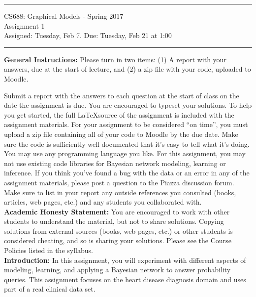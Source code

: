 \documentclass[11pt]{article}
\begin{document}
{\centering
  \rule{6.3in}{2pt}
  \vspace{1em}
  {\Large
    CS688: Graphical Models - Spring 2017 \\
    Assignment 1\\
  }
  \vspace{1em}
  Assigned: Tuesday, Feb 7. Due: Tuesday, Feb 21 at 1:00 \\
  \vspace{0.1em}
  \rule{6.3in}{1.5pt}
}
\vspace{1pc}


\textbf{General Instructions:} Please turn in two items: (1) A report with your answers, due at the start of lecture, and (2) a zip file with your code, uploaded to Moodle.

Submit a report with the answers to each question at the start of class on the date the assignment is due. You are encouraged to typeset your solutions. To help you get started, the full \LaTeX source of the assignment is included with the assignment materials. For your assignment to be considered ``on time'', you must upload a zip file containing all of your code to Moodle by the due date. Make sure the code is sufficiently well documented that it's easy to tell what it's doing. You may use any programming language you like. For this assignment, you may not use existing code libraries for Bayesian network modeling, learning or inference. If you think you've found a bug with the data or an error in any of the assignment materials, please post a question to the Piazza discussion forum. Make sure to list in your report any outside references you consulted (books, articles, web pages, etc.) and any students you collaborated with.\\ 

\textbf{Academic Honesty Statement:} You are encouraged to 
work with other students to understand the material, but not to share solutions.
Copying solutions from external
sources (books, web pages, etc.) or other students is considered
cheating, and so is sharing your solutions.  
Please see the Course Policies listed in the syllabus.  \\

\textbf{Introduction:} In this assignment, you will experiment with different aspects of modeling, learning, and applying a Bayesian network to answer probability queries. This assignment focuses on the heart disease diagnosis domain and uses part of a real clinical data set. \\
\end{document}
